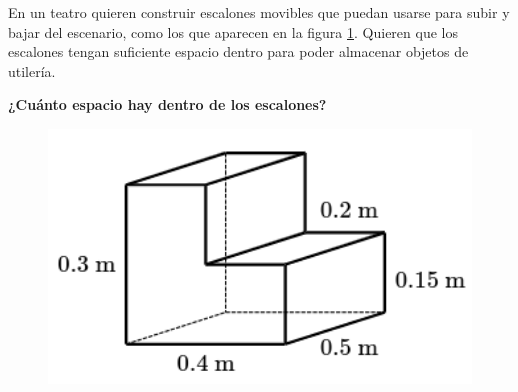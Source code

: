 En un teatro quieren construir escalones movibles que puedan
usarse para subir y bajar del escenario,
como los que aparecen en la figura \ref{fig:vol_area_01}.
Quieren que los escalones tengan suficiente espacio dentro para poder
almacenar objetos de utilería.

\textbf{¿Cuánto espacio hay dentro de los escalones?}\\

\begin{minipage}{0.3\linewidth}
    \begin{figure}[H]
        \begin{center}
            \includegraphics[width=1\textwidth]{../images/vol_area_01}
        \end{center}
        \caption{}
        \label{fig:vol_area_01}
    \end{figure}
\end{minipage}
\begin{minipage}{0.7\linewidth}
    \begin{solutionbox}{5cm}
    \end{solutionbox}
\end{minipage}